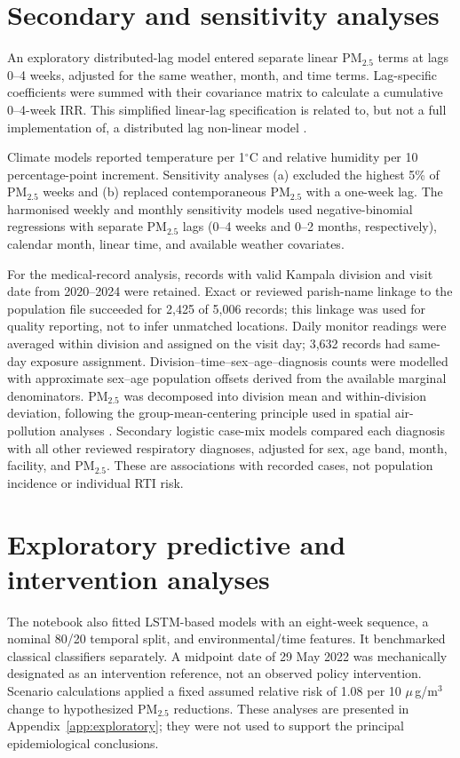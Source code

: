 \documentclass[12pt,a4paper]{report}
\newcommand{\pmfive}{PM$_{2.5}$}
\newcommand{\ugm}{\ensuremath{\mu}\,g/m$^3$}
\begin{document}
\section{Secondary and sensitivity analyses}
An exploratory distributed-lag model entered separate linear \pmfive{} terms at lags 0--4 weeks, adjusted for the same weather, month, and time terms. Lag-specific coefficients were summed with their covariance matrix to calculate a cumulative 0--4-week IRR. This simplified linear-lag specification is related to, but not a full implementation of, a distributed lag non-linear model \parencite{Gasparrini2010}.

Climate models reported temperature per 1$^\circ$C and relative humidity per 10 percentage-point increment. Sensitivity analyses (a) excluded the highest 5\% of \pmfive{} weeks and (b) replaced contemporaneous \pmfive{} with a one-week lag. The harmonised weekly and monthly sensitivity models used negative-binomial regressions with separate \pmfive{} lags (0--4 weeks and 0--2 months, respectively), calendar month, linear time, and available weather covariates.

For the medical-record analysis, records with valid Kampala division and visit date from 2020--2024 were retained. Exact or reviewed parish-name linkage to the population file succeeded for 2,425 of 5,006 records; this linkage was used for quality reporting, not to infer unmatched locations. Daily monitor readings were averaged within division and assigned on the visit day; 3,632 records had same-day exposure assignment. Division--time--sex--age--diagnosis counts were modelled with approximate sex--age population offsets derived from the available marginal denominators. \pmfive{} was decomposed into division mean and within-division deviation, following the group-mean-centering principle used in spatial air-pollution analyses \parencite{Adjorlolo2026}. Secondary logistic case-mix models compared each diagnosis with all other reviewed respiratory diagnoses, adjusted for sex, age band, month, facility, and \pmfive{}. These are associations with recorded cases, not population incidence or individual RTI risk.

\section{Exploratory predictive and intervention analyses}
The notebook also fitted LSTM-based models with an eight-week sequence, a nominal 80/20 temporal split, and environmental/time features. It benchmarked classical classifiers separately. A midpoint date of 29 May 2022 was mechanically designated as an intervention reference, not an observed policy intervention. Scenario calculations applied a fixed assumed relative risk of 1.08 per 10 \ugm{} change to hypothesized \pmfive{} reductions. These analyses are presented in Appendix~\ref{app:exploratory}; they were not used to support the principal epidemiological conclusions.
\end{document}
